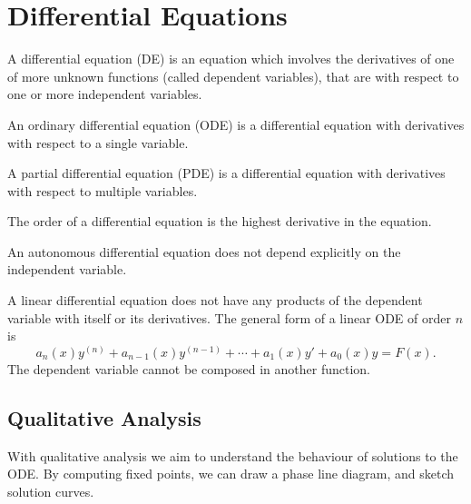 \documentclass{article}
\begin{document}
\section{Differential Equations}
\begin{definition}
    A differential equation (DE) is an equation which involves the derivatives of
    one of more unknown functions (called dependent variables), that are with respect
    to one or more independent variables.
\end{definition}
\begin{definition}
    An ordinary differential equation (ODE) is a differential equation with
    derivatives with respect to a single variable.
\end{definition}
\begin{definition}
    A partial differential equation (PDE) is a differential equation with
    derivatives with respect to multiple variables.
\end{definition}
\begin{definition}
    The order of a differential equation is the highest derivative in the equation.
\end{definition}
\begin{definition}
    An autonomous differential equation does not depend explicitly on the independent variable.
\end{definition}
\begin{definition}
    A linear differential equation does not have any products of the dependent variable with itself
    or its derivatives. The general form of a linear ODE of order $n$ is
    \begin{equation*}
        a_n(x)y^{\left( n \right)} + a_{n-1}(x)y^{\left( n-1 \right)} + \cdots + a_1(x)y' + a_0(x)y = F(x).
    \end{equation*}
    The dependent variable cannot be composed in another function.
\end{definition}
\subsection{Qualitative Analysis}
With qualitative analysis we aim to understand the behaviour of solutions to the ODE.
By \linebreak computing fixed points, we can draw a phase line diagram, and sketch solution curves.
\end{document}
